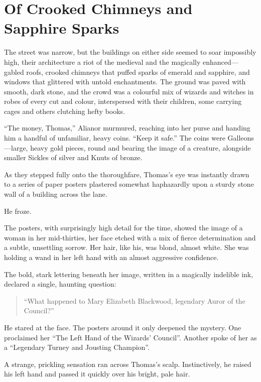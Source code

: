 
\chapter{Of Crooked Chimneys and Sapphire Sparks}

The street was narrow, but the buildings on either side seemed to soar impossibly high, their architecture a riot of the medieval and the magically enhanced---gabled roofs, crooked chimneys that puffed sparks of emerald and sapphire, and windows that glittered with untold enchantments. The ground was paved with smooth, dark stone, and the crowd was a colourful mix of wizards and witches in robes of every cut and colour, interspersed with their children, some carrying cages and others clutching hefty books.

\enquote{The money, Thomas,} Alianor murmured, reaching into her purse and handing him a handful of unfamiliar, heavy coins. \enquote{Keep it safe.} The coins were Galleons---large, heavy gold pieces, round and bearing the image of a creature, alongside smaller Sickles of silver and Knuts of bronze.

As they stepped fully onto the thoroughfare, Thomas's eye was instantly drawn to a series of paper posters plastered somewhat haphazardly upon a sturdy stone wall of a building across the lane.

He froze.

The posters, with surprisingly high detail for the time, showed the image of a woman in her mid-thirties, her face etched with a mix of fierce determination and a subtle, unsettling sorrow. Her hair, like his, was blond, almost white. She was holding a wand in her left hand with an almost aggressive confidence.

The bold, stark lettering beneath her image, written in a magically indelible ink, declared a single, haunting question:

\begin{quote}
    \enquote{What happened to Mary Elizabeth Blackwood, legendary Auror of the Council?}
\end{quote}

He stared at the face. The posters around it only deepened the mystery. One proclaimed her \enquote{The Left Hand of the Wizards' Council}. Another spoke of her as a \enquote{Legendary Turney and Jousting Champion}.

A strange, prickling sensation ran across Thomas's scalp. Instinctively, he raised his left hand and passed it quickly over his bright, pale hair.

